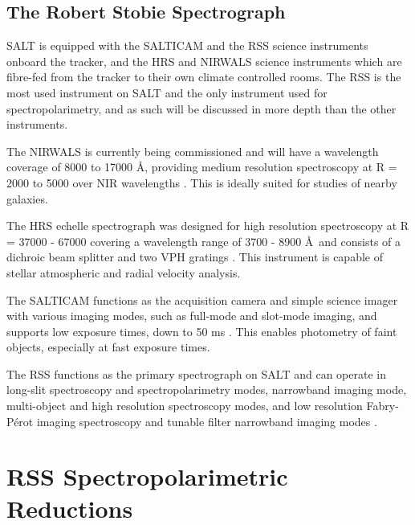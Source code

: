 \subsection{The Robert Stobie Spectrograph} \label{subsec:RSS}

SALT is equipped with the \gls{SALTICAM} and the \gls{RSS} science instruments onboard the tracker, and the \gls{HRS} and \gls{NIRWALS} science instruments which are fibre-fed from the tracker to their own climate controlled rooms. The \gls{RSS} is the most used instrument on \gls{SALT} and the only instrument used for spectropolarimetry, and as such will be discussed in more depth than the other instruments.

The \gls{NIRWALS} is currently being commissioned and will have a wavelength coverage of 8000 to 17000 \AA, providing medium resolution spectroscopy at R = 2000 to 5000 over \gls{NIR} wavelengths \citep{NIRWALS, SALT_NIRWALS}. This is ideally suited for studies of nearby galaxies.

The \gls{HRS} echelle spectrograph was designed for high resolution spectroscopy at R = 37000 - 67000 covering a wavelength range of 3700 - 8900 \AA\ and consists of a dichroic beam splitter and two \gls{VPH} gratings \citep{SALT_hires}. This instrument is capable of stellar atmospheric and radial velocity analysis.

The SALTICAM functions as the acquisition camera and simple science imager with various imaging modes, such as full-mode and slot-mode imaging, and supports low exposure times, down to 50 ms \citep{SALTICAM}. This enables photometry of faint objects, especially at fast exposure times.
\prgph

The \gls{RSS} functions as the primary spectrograph on \gls{SALT} and can operate in long-slit spectroscopy and spectropolarimetry modes, narrowband imaging mode, multi-object and high resolution spectroscopy modes, and low resolution Fabry-P\'erot imaging spectroscopy and tunable filter narrowband imaging modes \citep[for an in-depth discussion on operational modes see][]{SALT_operational_modes}.
\prgph


\section{RSS Spectropolarimetric Reductions} \label{sec:RSS_reductions} %

